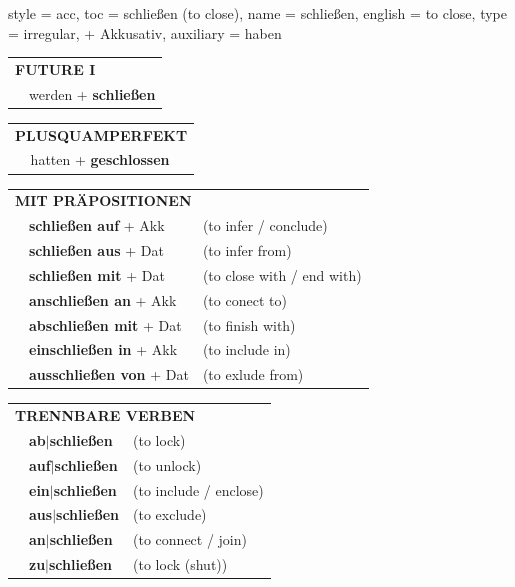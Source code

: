 \begin{verbentry}{
  style = {acc},
  toc = {schließen (to close)},
  name = {schließen},
  english = {to close},
  type = {irregular, + Akkusativ},
  auxiliary = {haben}
}
\begin{tabular}{rl}
    \multicolumn{2}{l}{\textbf{FUTURE I} }\\
   & werden + \textbf{schließen}\\
 
  \end{tabular}
\hfill
   \begin{tabular}{rl}
      \multicolumn{2}{l}{\textbf{PLUSQUAMPERFEKT}}\\
   & hatten + \textbf{geschlossen}\\
  \end{tabular}
  
  \vspace{10pt}

   \begin{tabular}{lll}
      \multicolumn{3}{l}{\textbf{MIT PRÄPOSITIONEN}}\\
      & \textbf{schließen auf} + Akk & (to infer / conclude)\\
&\textbf{schließen aus} + Dat & (to infer from)\\
&\textbf{schließen mit} + Dat & (to close with / end with)\\
& \textbf{anschließen an} + Akk & (to conect to)\\
& \textbf{abschließen mit} + Dat & (to finish with)\\
&\textbf{einschließen in} + Akk & (to include in)\\
&\textbf{ausschließen von} + Dat & (to exlude from)
  \end{tabular}
  \hfill
   \begin{tabular}{lll}
      \multicolumn{3}{l}{\textbf{TRENNBARE VERBEN}}\\
 & \textbf{ab$|$schließen} & (to lock)\\
 & \textbf{auf$|$schließen} & (to unlock)\\
 & \textbf{ein$|$schließen} & (to include / enclose)\\
  & \textbf{aus$|$schließen} & (to exclude)\\
  & \textbf{an$|$schließen} & (to connect / join)\\
  & \textbf{zu$|$schließen} & (to lock (shut))
  \end{tabular}




  \vspace{-5pt}
\end{verbentry}

